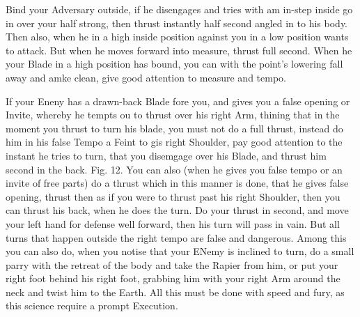 Bind your Adversary outside, if he disengages and tries with am in-step inside go in over your half strong, then thrust instantly half second angled in to his body. Then also, when he in a high inside position against you in a low position wants to attack. But when he moves forward into measure, thrust full second. When he your Blade in a high position has bound, you can with the point's lowering fall away and amke clean, give good attention to measure and tempo.




If your Eneny has a drawn-back Blade fore you, and gives you a false opening or Invite, whereby he tempts ou to thrust over his right Arm, thining that in the moment you thrust to turn his blade, you must not do a full thrust, instead do him in his false Tempo a Feint to gis right Shoulder, pay good attention to the instant he tries to turn, that you disemgage over his Blade, and thrust him second in the back. Fig. 12. You can also (when he gives you false tempo or an invite of free parts) do a thrust which in this manner is done, that he gives false opening, thrust then as if you were to thrust past his right Shoulder, then you can thrust his back, when he does the turn. Do your thrust in second, and move your left hand for defense well forward, then his turn will pass in vain. But all turns that happen outside the right tempo are false and dangerous. Among this you can also do, when you notise that your ENemy is inclined to turn, do a small parry with the retreat of the body and take the Rapier from him, or put your right foot behind his right foot, grabbing him with your right Arm around the neck and twist him to the Earth. All this must be done with speed and fury, as this science require a prompt Execution.

